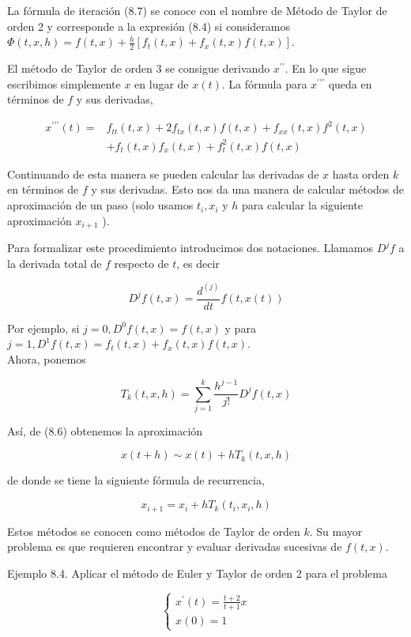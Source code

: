 \documentclass[10pt]{article}
\begin{document}
La fórmula de iteración (8.7) se conoce con el nombre de Método de Taylor de orden 2 y corresponde a la expresión (8.4) si consideramos $\Phi(t, x, h)=f(t, x)+\frac{h}{2}\left[f_{t}(t, x)+f_{x}(t, x) f(t, x)\right]$.

El método de Taylor de orden 3 se consigue derivando $x^{\prime \prime}$. En lo que sigue escribimos simplemente $x$ en lugar de $x(t)$. La fórmula para $x^{\prime \prime \prime}$ queda en términos de $f$ y sus derivadas,

$$
\begin{aligned}
x^{\prime \prime \prime}(t)= & f_{t t}(t, x)+2 f_{t x}(t, x) f(t, x)+f_{x x}(t, x) f^{2}(t, x) \\
& +f_{t}(t, x) f_{x}(t, x)+f_{t}^{2}(t, x) f(t, x)
\end{aligned}
$$

Continuando de esta manera se pueden calcular las derivadas de $x$ hasta orden $k$ en términos de $f$ y sus derivadas. Esto nos da una manera de calcular métodos de aproximación de un paso (solo usamos $t_{i}, x_{i}$ y $h$ para calcular la siguiente aproximación $x_{i+1}$ ).

Para formalizar este procedimiento introducimos dos notaciones. Llamamos $D^{j} f$ a la derivada total de $f$ respecto de $t$, es decir

$$
D^{j} f(t, x)=\frac{d^{(j)}}{d t} f(t, x(t))
$$

Por ejemplo, si $j=0, D^{0} f(t, x)=f(t, x)$ y para $j=1, D^{1} f(t, x)=f_{t}(t, x)+f_{x}(t, x) f(t, x)$.\\
Ahora, ponemos


\begin{equation*}
T_{k}(t, x, h)=\sum_{j=1}^{k} \frac{h^{j-1}}{j!} D^{j} f(t, x) \tag{8.8}
\end{equation*}


Así, de (8.6) obtenemos la aproximación

$$
x(t+h) \sim x(t)+h T_{k}(t, x, h)
$$

de donde se tiene la siguiente fórmula de recurrencia,

$$
x_{i+1}=x_{i}+h T_{k}\left(t_{i}, x_{i}, h\right)
$$

Estos métodos se conocen como métodos de Taylor de orden $k$. Su mayor problema es que requieren encontrar y evaluar derivadas sucesivas de $f(t, x)$.

Ejemplo 8.4. Aplicar el método de Euler y Taylor de orden 2 para el problema

$$
\left\{\begin{array}{l}
x^{\prime}(t)=\frac{t+2}{t+1} x \\
x(0)=1
\end{array}\right.
$$
\end{document}
